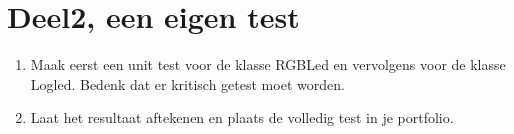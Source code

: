 \section{Deel2, een eigen test}

\begin{enumerate}[label=(\Alph*)]
	\item 
Maak eerst een unit test voor de klasse RGBLed en vervolgens voor de klasse Logled. Bedenk dat er kritisch getest moet worden.

\item Laat het resultaat aftekenen en plaats de volledig test in je portfolio.
\end{enumerate}